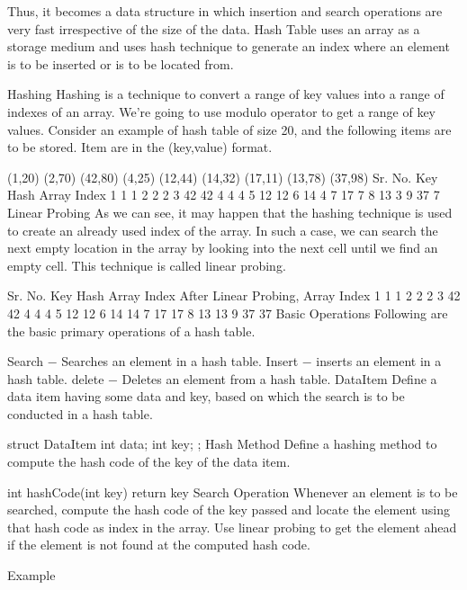 Thus, it becomes a data structure in which insertion and search operations are very fast irrespective of the size of the data. Hash Table uses an array as a storage medium and uses hash technique to generate an index where an element is to be inserted or is to be located from.

Hashing
Hashing is a technique to convert a range of key values into a range of indexes of an array. We're going to use modulo operator to get a range of key values. Consider an example of hash table of size 20, and the following items are to be stored. Item are in the (key,value) format.



(1,20)
(2,70)
(42,80)
(4,25)
(12,44)
(14,32)
(17,11)
(13,78)
(37,98)
Sr. No.	Key	Hash	Array Index
1	1	1 %
2	2	2 %
3	42	42 %
4	4	4 %
5	12	12 %
6	14	4 %
7	17	7 %
8	13	3 %
9	37	7 %
Linear Probing
As we can see, it may happen that the hashing technique is used to create an already used index of the array. In such a case, we can search the next empty location in the array by looking into the next cell until we find an empty cell. This technique is called linear probing.

Sr. No.	Key	Hash	Array Index	After Linear Probing, Array Index
1	1	1 %
2	2	2 %
3	42	42 %
4	4	4 %
5	12	12 %
6	14	14 %
7	17	17 %
8	13	13 %
9	37	37 %
Basic Operations
Following are the basic primary operations of a hash table.

Search − Searches an element in a hash table.
Insert − inserts an element in a hash table.
delete − Deletes an element from a hash table.
DataItem
Define a data item having some data and key, based on which the search is to be conducted in a hash table.

struct DataItem {
   int data;
   int key;
};
Hash Method
Define a hashing method to compute the hash code of the key of the data item.

int hashCode(int key){
   return key %
}
Search Operation
Whenever an element is to be searched, compute the hash code of the key passed and locate the element using that hash code as index in the array. Use linear probing to get the element ahead if the element is not found at the computed hash code.

Example

